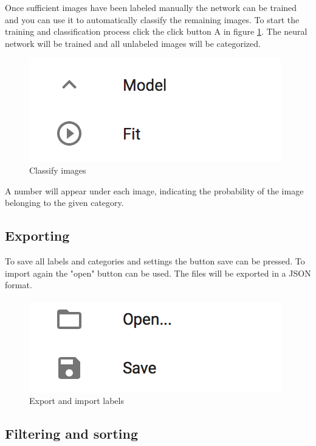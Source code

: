 Once sufficient images have been labeled manually the network can be trained and you can use it 
to automatically classify the remaining images.
To start the training and classification process click the click button A in figure \ref{fig:Classify}.
The neural network will be trained and all unlabeled
images will be categorized.

\begin{figure}[H]
	\centering
	\includegraphics[scale=0.8]{bilder/cyto/Fit.png}
	\caption{Classify images}
	\label{fig:Classify}
\end{figure}

A number will appear under each image, indicating the
probability of the image belonging to the given category. 

\subsection{Exporting}

To save all labels and categories and settings the button save can be pressed. To import again the "open" button can be used. The files will be exported in a JSON format.

\begin{figure}[H]
	\centering
	\includegraphics[scale=0.8]{bilder/cyto/OpenSave.png}
	\caption{Export and import labels}
	\label{fig:ExportImport}
\end{figure}

\subsection{Filtering and sorting}
 
